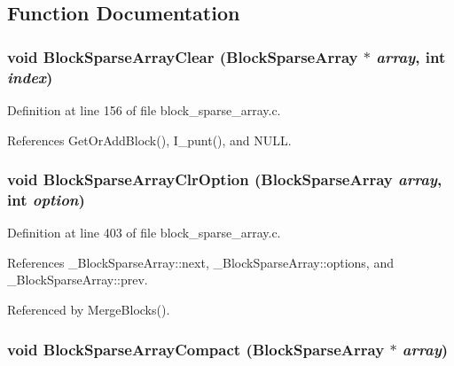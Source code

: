 \subsection{Function Documentation}
\subsubsection{\setlength{\rightskip}{0pt plus 5cm}void Block\-Sparse\-Array\-Clear (\bf{Block\-Sparse\-Array} $\ast$ {\em array}, int {\em index})}\label{block__sparse__array_8h_addb19ecae936e51d15d2054eeffdbe1}




Definition at line 156 of file block\_\-sparse\_\-array.c.

References Get\-Or\-Add\-Block(), I\_\-punt(), and NULL.
\subsubsection{\setlength{\rightskip}{0pt plus 5cm}void Block\-Sparse\-Array\-Clr\-Option (\bf{Block\-Sparse\-Array} {\em array}, int {\em option})}\label{block__sparse__array_8h_c0a4eb2f032ed20389a564bf174c98fe}




Definition at line 403 of file block\_\-sparse\_\-array.c.

References \_\-Block\-Sparse\-Array::next, \_\-Block\-Sparse\-Array::options, and \_\-Block\-Sparse\-Array::prev.

Referenced by Merge\-Blocks().
\subsubsection{\setlength{\rightskip}{0pt plus 5cm}void Block\-Sparse\-Array\-Compact (\bf{Block\-Sparse\-Array} $\ast$ {\em array})}\label{block__sparse__array_8h_ca4448964f6ae7164e8e6b7e3fdebdc8}




